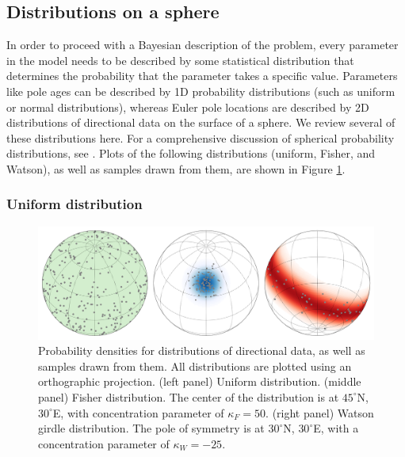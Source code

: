 \documentclass[]{agujournal2019}
\begin{document}
\subsection*{Distributions on a sphere}

In order to proceed with a Bayesian description of the problem, every parameter in the model needs to be described by some statistical distribution that determines the probability that the parameter takes a specific value. Parameters like pole ages can be described by 1D probability distributions (such as uniform or normal distributions), whereas Euler pole locations are described by 2D distributions of directional data on the surface of a sphere. We review several of these distributions here. For a comprehensive discussion of spherical probability distributions, see . Plots of the following distributions (uniform, Fisher, and Watson), as well as samples drawn from them, are shown in Figure \ref{fig:distributions}. 

\subsubsection*{Uniform distribution}
\begin{figure}
\centering
\includegraphics[width=\textwidth]{fig_direction_distributions.png}
\caption[Spherical probability distributions.]{Probability densities for distributions of directional data, as well as samples drawn from them. All distributions are plotted using an orthographic projection. (left panel) Uniform distribution. (middle panel) Fisher distribution. The center of the distribution is at $45^\circ$N, $30^\circ$E, with concentration parameter of $\kappa_F=50$. (right panel) Watson girdle distribution. The pole of symmetry is at $30^\circ$N, $30^\circ$E, with a concentration parameter of $\kappa_W=-25$.}
\label{fig:distributions}
\end{figure}
\end{document}
